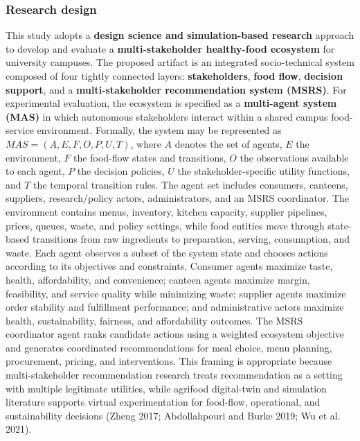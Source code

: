 \documentclass[
  letterpaper,
  DIV=11,
  numbers=noendperiod]{scrartcl}
\begin{document}
\subsubsection{Research design}\label{research-design}

This study adopts a \textbf{design science and simulation-based
research} approach to develop and evaluate a \textbf{multi-stakeholder
healthy-food ecosystem} for university campuses. The proposed artifact
is an integrated socio-technical system composed of four tightly
connected layers: \textbf{stakeholders}, \textbf{food flow},
\textbf{decision support}, and a \textbf{multi-stakeholder
recommendation system (MSRS)}. For experimental evaluation, the
ecosystem is specified as a \textbf{multi-agent system (MAS)} in which
autonomous stakeholders interact within a shared campus food-service
environment. Formally, the system may be represented as
\(MAS = (A, E, F, O, P, U, T)\), where \(A\) denotes the set of agents,
\(E\) the environment, \(F\) the food-flow states and transitions, \(O\)
the observations available to each agent, \(P\) the decision policies,
\(U\) the stakeholder-specific utility functions, and \(T\) the temporal
transition rules. The agent set includes consumers, canteens, suppliers,
research/policy actors, administrators, and an MSRS coordinator. The
environment contains menus, inventory, kitchen capacity, supplier
pipelines, prices, queues, waste, and policy settings, while food
entities move through state-based transitions from raw ingredients to
preparation, serving, consumption, and waste. Each agent observes a
subset of the system state and chooses actions according to its
objectives and constraints. Consumer agents maximize taste, health,
affordability, and convenience; canteen agents maximize margin,
feasibility, and service quality while minimizing waste; supplier agents
maximize order stability and fulfillment performance; and administrative
actors maximize health, sustainability, fairness, and affordability
outcomes. The MSRS coordinator agent ranks candidate actions using a
weighted ecosystem objective and generates coordinated recommendations
for meal choice, menu planning, procurement, pricing, and interventions.
This framing is appropriate because multi-stakeholder recommendation
research treats recommendation as a setting with multiple legitimate
utilities, while agrifood digital-twin and simulation literature
supports virtual experimentation for food-flow, operational, and
sustainability decisions (Zheng 2017; Abdollahpouri and Burke 2019; {Wu
et al.} 2021).
\end{document}

